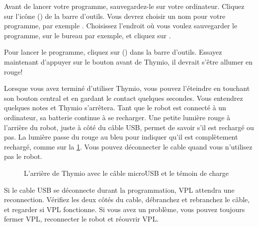 
Avant de lancer votre programme, sauvegardez-le sur votre ordinateur.
Cliquez sur l'icône  () de la barre d'outils.
Vous devrez choisir un nom pour votre programme, par exemple .
Choisissez l'endroit où vous voulez sauvegarder le programme, sur le bureau par exemple, et cliquez sur .



Pour lancer le programme, cliquez sur  () dans la barre d'outils.
Essayez maintenant d'appuyer sur le bouton avant de Thymio, il devrait s'être allumer en rouge!



Lorsque vous avez terminé d'utiliser Thymio, vous pouvez l'éteindre en touchant son bouton central et en gardant le contact quelques secondes.
Vous entendrez quelques notes et Thymio s'arrêtera.
Tant que le robot est connecté à un ordinateur, sa batterie continue à se recharger. Une petite lumière rouge à l'arrière du robot, juste à côté du câble USB, permet de savoir s'il est rechargé ou pas. La lumière passe du rouge au bleu pour indiquer qu'il est complètement rechargé, comme sur la \cref{fig.back}.
Vous pouvez déconnecter le cable quand vous n'utilisez pas le robot.


\begin{figure}
\begin{center}
\caption{L'arrière de Thymio avec le câble microUSB et le témoin de charge}\label{fig.back}
\end{center}
\end{figure}

Si le cable USB se déconnecte durant la programmation, VPL attendra une reconnection.
Vérifiez les deux côtés du cable, débranchez et rebranchez le câble, et regarder si VPL fonctionne.
Si vous avez un problème, vous pouvez toujours fermer VPL, reconnecter le robot et réouvrir VPL.

